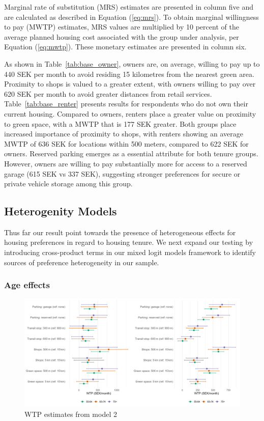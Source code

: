 \documentclass[3p,11pt ]{elsarticle}
\begin{document}
Marginal rate of substitution (MRS) estimates are presented in column five and are calculated as described in Equation (\ref{eq:mrs}).
To obtain marginal willingness to pay (MWTP) estimates,
MRS values are multiplied by 10 percent of the average planned housing cost associated with the group under analysis, per Equation (\ref{eq:mwtp}). These monetary estimates are presented in column six.

As shown in Table~\ref{tab:base_owner},
owners are, on average, willing to pay up to 440 SEK per month to avoid residing 15 kilometres from the nearest green area.
Proximity to shops is valued to a greater extent, with owners willing to pay over 620 SEK per month to avoid greater distances from retail services.
Table~\ref{tab:base_renter} presents results for respondents who do not own their current housing.
Compared to owners,
renters place a greater value on proximity to green space, with a MWTP that is 177 SEK greater.
Both groups place increased importance of proximity to shops, with renters showing an average MWTP of 636 SEK for locations within 500 meters, compared to 622 SEK for owners.
Reserved parking emerges as a essential attribute for both tenure groups.
However, owners are willing to pay substantially more for access to a reserved garage (615 SEK vs 337 SEK),
suggesting stronger preferences for secure or private vehicle storage among this group.






\clearpage


\subsection{Heterogenity Models}

Thus far our result point towards the presence of heterogeneous effects for housing preferences in regard to housing tenure. 
We next expand our testing by introducing cross-product terms in our mixed logit models framework to identify sources of preference heterogeneity in our sample.

\subsubsection{Age effects}


\begin{figure}[H]
\centering
\includegraphics[scale=0.40]{figures/wtp_combined_side_by_side.png}
\caption{WTP estimates from model 2 \label{fig:wtp}}
\end{figure}
\end{document}
